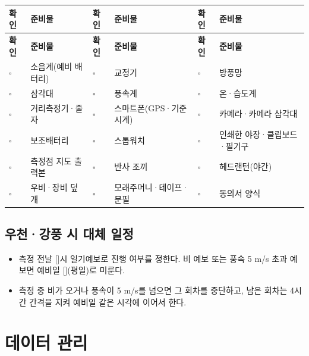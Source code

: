 \documentclass[10.5pt,a4paper]{article}
\newcommand{\IN}{[\quad]}
\newcommand{\hd}[1]{\cellcolor{headfill}\textbf{\sffamily #1}}
\begin{document}
\begin{longtable}{>{\centering\arraybackslash}p{}>{\raggedright\arraybackslash}p{}>{\centering\arraybackslash}p{}>{\raggedright\arraybackslash}p{}>{\centering\arraybackslash}p{}>{\raggedright\arraybackslash}p{}}
\toprule
\hd{확인} & \hd{준비물} & \hd{확인} & \hd{준비물} & \hd{확인} & \hd{준비물} \\ \midrule
\endfirsthead
\toprule
\hd{확인} & \hd{준비물} & \hd{확인} & \hd{준비물} & \hd{확인} & \hd{준비물} \\ \midrule
\endhead
\bottomrule
\endlastfoot
$\square$ & 소음계(예비 배터리) & $\square$ & 교정기 & $\square$ & 방풍망 \\ \midrule
$\square$ & 삼각대 & $\square$ & 풍속계 & $\square$ & 온·습도계 \\ \midrule
$\square$ & 거리측정기·줄자 & $\square$ & 스마트폰(GPS·기준 시계) & $\square$ & 카메라·카메라 삼각대 \\ \midrule
$\square$ & 보조배터리 & $\square$ & 스톱워치 & $\square$ & 인쇄한 야장·클립보드·필기구 \\ \midrule
$\square$ & 측정점 지도 출력본 & $\square$ & 반사 조끼 & $\square$ & 헤드랜턴(야간) \\ \midrule
$\square$ & 우비·장비 덮개 & $\square$ & 모래주머니·테이프·분필 & $\square$ & 동의서 양식 \\
\end{longtable}
\addtocounter{table}{-1}
\normalsize
{}\subsection{우천·강풍 시 대체 일정}
\begin{itemize}
\item 측정 전날 \IN 시 일기예보로 진행 여부를 정한다. 비 예보 또는 풍속 5 m/s 초과 예보면 예비일 \IN(평일)로 미룬다.
\item 측정 중 비가 오거나 풍속이 5 m/s를 넘으면 그 회차를 중단하고, 남은 회차는 4시간 간격을 지켜 예비일 같은 시각에 이어서 한다.
\end{itemize}
\section{데이터 관리}
\footnotesize
\end{document}
